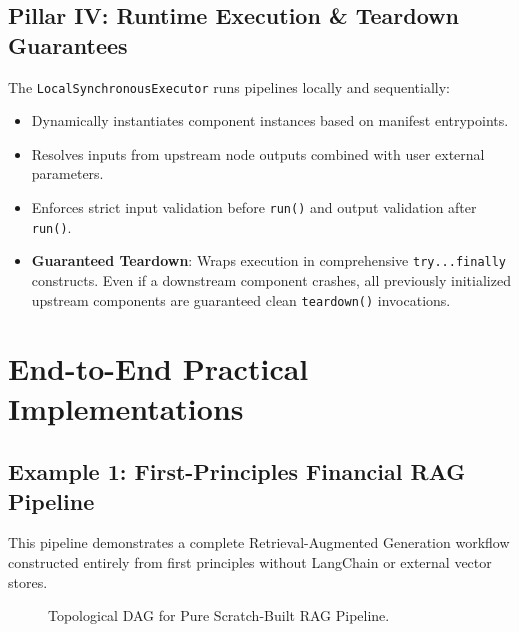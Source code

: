 \documentclass[11pt,a4paper]{article}
\begin{document}
\subsection{Pillar IV: Runtime Execution \& Teardown Guarantees}
The \texttt{LocalSynchronousExecutor} runs pipelines locally and sequentially:
\begin{itemize}[leftmargin=1.5em, itemsep=2pt]
    \item Dynamically instantiates component instances based on manifest entrypoints.
    \item Resolves inputs from upstream node outputs combined with user external parameters.
    \item Enforces strict input validation before \texttt{run()} and output validation after \texttt{run()}.
    \item \textbf{Guaranteed Teardown}: Wraps execution in comprehensive \texttt{try...finally} constructs. Even if a downstream component crashes, all previously initialized upstream components are guaranteed clean \texttt{teardown()} invocations.
\end{itemize}

\section{End-to-End Practical Implementations}

\subsection{Example 1: First-Principles Financial RAG Pipeline}
This pipeline demonstrates a complete Retrieval-Augmented Generation workflow constructed entirely from first principles without LangChain or external vector stores.

\begin{figure}[h!]
\centering
{}
\caption{Topological DAG for Pure Scratch-Built RAG Pipeline.}
\label{fig:rag_dag}
\end{figure}
\end{document}
